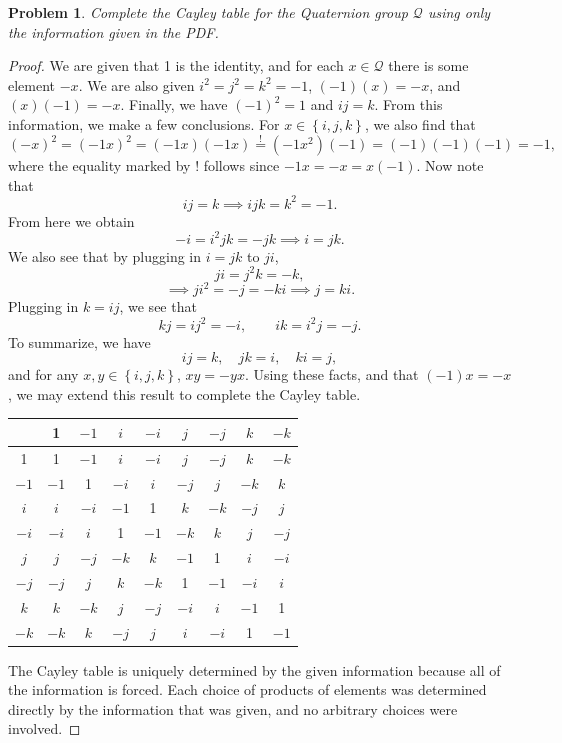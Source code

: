 \documentclass[11pt, letterpaper]{article}
\theoremstyle{plain}
\newtheorem{problem}{Problem}[section]
\begin{document}
\begin{problem}
	Complete the Cayley table for the Quaternion group $\mathcal{Q} $ using only the information given in the PDF.
\end{problem}
\begin{proof}
	We are given that 1 is the identity, and for each $x\in \mathcal{Q} $ there is some element $-x$. We are also given $i^2=j^2=k^2=-1$, $(-1)(x)=-x$, and $(x)(-1)=-x$. Finally, we have $(-1)^2=1$ and $ij=k$. From this information, we make a few conclusions. For $x\in \left\{ i,j,k \right\} $, we also find that
	\[
		(-x)^2=(-1x)^2=(-1x)(-1x)\overset{!}{=}(-1x^2)(-1)=(-1)(-1)(-1)=-1,
	\]
	where the equality marked by $!$ follows since $-1x=-x=x(-1)$. Now note that
	\[
		ij=k \implies ijk=k^2 = -1
	.\]
	From here we obtain
	\[
		-i=i^2jk = -jk \implies i=jk
	.\]
	We also see that by plugging in $i=jk$ to $ji$,
	\[
		ji=j^2k= -k
	,\]
	\[
		\implies ji^2 = -j = -ki \implies j=ki
	.\]
	Plugging in $k=ij$, we see that
	\[
		kj=ij^2=-i,\qquad ik=i^2j=-j
	.\]
	To summarize, we have
	\[
		ij=k,\quad jk=i,\quad ki=j,
	\]
	and for any $x,y\in \left\{ i,j,k \right\} $, $xy=-yx$. Using these facts, and that $(-1)x=-x$, we may extend this result to complete the Cayley table.
	\begin{center}
	\begin{tabular}{c||c|c|c|c|c|c|c|c}
		&1&$-1$&$i$&$-i$&$j$&$-j$&$k$&$-k$\\
		\hline
		\hline
		1&1&$-1$&$i$&$-i$&$j$&$-j$&$k$&$-k$\\
		\hline
		$-1$&$-1$&1&$-i$&$i$&$-j$&$j$&$-k$&$k$\\
		\hline
		$i$&$i$&$-i$&$-1$&1&$k$&$-k$&$-j$&$j$\\
		\hline
		$-i$&$-i$&$i$&1&$-1$&$-k$&$k$&$j$&$-j$\\
		\hline
		$j$&$j$&$-j$&$-k$&$k$&$-1$&1&$i$&$-i$\\
		\hline
		$-j$&$-j$&$j$&$k$&$-k$&1&$-1$&$-i$&$i$\\
		\hline
		$k$&$k$&$-k$&$j$&$-j$&$-i$&$i$&$-1$&1\\
		\hline
		$-k$&$-k$&$k$&$-j$&$j$&$i$&$-i$&1&$-1$
	\end{tabular}
\end{center}

The Cayley table is uniquely determined by the given information because all of the information is forced. Each choice of products of elements was determined directly by the information that was given, and no arbitrary choices were involved.
	
\end{proof}
\end{document}
